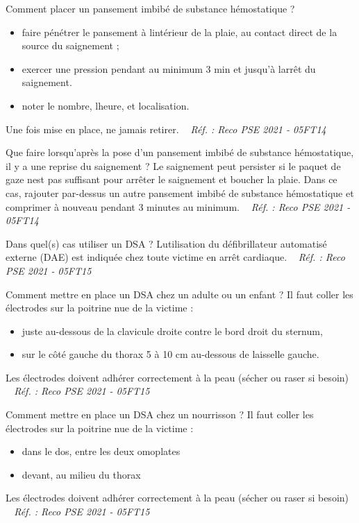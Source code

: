 \documentclass[grid,avery5371,landscape]{flashcards}
\makeatletter
\newcounter{nocarte}
\newcommand{\categ}[1]{%
  \def\@categ{#1}%
  \setcounter{nocarte}{0}%
}
\newcommand{\source}[1]{%
  \medskip
  \itshape%
   ~ \hfill Réf. : #1}
\makeatother
\begin{document}
\color[HTML]{003273}
\categ{PSE}
\begin{flashcard}[geste]{
 Comment placer un pansement imbibé de substance hémostatique ?   }
  \begin{itemize}
\item faire pénétrer le pansement à lintérieur de la plaie, au contact direct de la source du saignement ;
\item exercer une pression pendant au minimum 3 min et jusqu'à larrêt du saignement.
\item noter le nombre,  lheure, et localisation. 
\end{itemize}
Une fois mise en place, ne jamais retirer.
  \source{Reco PSE 2021 - 05FT14}
\end{flashcard}


\color[HTML]{003273}
\categ{PSE}
\begin{flashcard}[CAT]{
 Que faire lorsqu'après la pose d'un pansement imbibé de substance hémostatique, il y a une reprise du saignement ?   }
  Le saignement peut persister si le paquet de gaze nest pas suffisant pour arrêter le saignement et boucher la plaie. Dans ce cas, rajouter par-dessus un autre pansement imbibé de substance hémostatique et comprimer à nouveau pendant 3 minutes au minimum.
  \source{Reco PSE 2021 - 05FT14}
\end{flashcard}


\color[HTML]{003273}
\categ{PSE}
\begin{flashcard}[CAT]{
 Dans quel(s) cas utiliser un DSA ?   }
  Lutilisation du défibrillateur automatisé externe (DAE) est indiquée chez toute victime en arrêt cardiaque.
  \source{Reco PSE 2021 - 05FT15}
\end{flashcard}


\color[HTML]{003273}
\categ{PSE}
\begin{flashcard}[geste]{
 Comment mettre en place un DSA chez un adulte ou un enfant ?   }
  Il faut coller les électrodes sur la poitrine nue de la victime :\begin{itemize}
\item juste au-dessous de la clavicule droite contre le bord droit du sternum, 
\item sur le côté gauche du thorax 5 à 10 cm au-dessous de laisselle gauche.
\end{itemize}
Les électrodes doivent adhérer correctement à la peau (sécher ou raser si besoin)
  \source{Reco PSE 2021 - 05FT15}
\end{flashcard}


\color[HTML]{003273}
\categ{PSE}
\begin{flashcard}[geste]{
 Comment mettre en place un DSA chez un nourrisson ?   }
  Il faut coller les électrodes sur la poitrine nue de la victime :\begin{itemize}
\item dans le dos, entre les deux omoplates
\item devant, au milieu du thorax
\end{itemize}
Les électrodes doivent adhérer correctement à la peau (sécher ou raser si besoin)
  \source{Reco PSE 2021 - 05FT15}
\end{flashcard}
\end{document}
